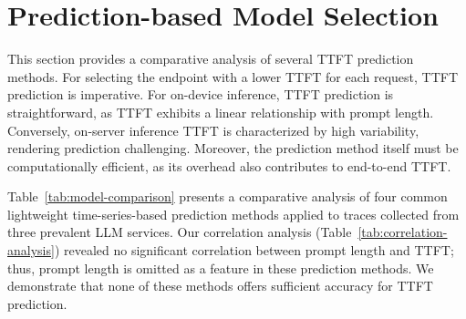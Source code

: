 \section{Prediction-based Model Selection}\label{appendix:prediction}

This section provides a comparative analysis of several TTFT prediction methods. For selecting the endpoint with a lower TTFT for each request, TTFT prediction is imperative. For on-device inference, TTFT prediction is straightforward, as TTFT exhibits a linear relationship with prompt length. Conversely, on-server inference TTFT is characterized by high variability, rendering prediction challenging. Moreover, the prediction method itself must be computationally efficient, as its overhead also contributes to end-to-end TTFT.

Table~\ref{tab:model-comparison} presents a comparative analysis of four common lightweight time-series-based prediction methods applied to traces collected from three prevalent LLM services. Our correlation analysis (Table~\ref{tab:correlation-analysis}) revealed no significant correlation between prompt length and TTFT; thus, prompt length is omitted as a feature in these prediction methods. We demonstrate that none of these methods offers sufficient accuracy for TTFT prediction.

